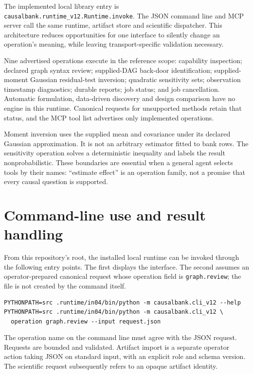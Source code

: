 The implemented local library entry is
\texttt{causalbank.runtime\_v12.Runtime.invoke}. The JSON command line and MCP
server call the same runtime, artifact store and scientific dispatcher. This
architecture reduces opportunities for one interface to silently change an
operation's meaning, while leaving transport-specific validation necessary.
\cite{v12_in_runtime}

Nine advertised operations execute in the reference scope: capability
inspection; declared graph syntax review; supplied-DAG back-door identification;
supplied-moment Gaussian residual-test inversion; quadratic sensitivity sets;
observation timestamp diagnostics; durable reports; job status; and job
cancellation. Automatic formulation, data-driven discovery and design comparison
have no engine in this runtime. Canonical requests for unsupported methods
retain that status, and the MCP tool list advertises only implemented operations.

Moment inversion uses the supplied mean and covariance under its declared
Gaussian approximation. It is not an arbitrary estimator fitted to bank rows.
The sensitivity operation solves a deterministic inequality and labels the
result nonprobabilistic. These boundaries are essential when a general agent
selects tools by their names: ``estimate effect'' is an operation family, not a
promise that every causal question is supported.

\section{Command-line use and result handling}

From this repository's root, the installed local runtime can be invoked through
the following entry points. The first displays the interface. The second
assumes an operator-prepared canonical request whose operation field is
\texttt{graph.review}; the file is not created by the command itself.
\begin{lstlisting}
PYTHONPATH=src .runtime/in04/bin/python -m causalbank.cli_v12 --help
PYTHONPATH=src .runtime/in04/bin/python -m causalbank.cli_v12 \
  operation graph.review --input request.json
\end{lstlisting}
The operation name on the command line must agree with the JSON request.
Requests are bounded and validated. Artifact import is a separate operator
action taking JSON on standard input, with an explicit role and schema version.
The scientific request subsequently refers to an opaque artifact identity.
\cite{v12_in_runtime}

